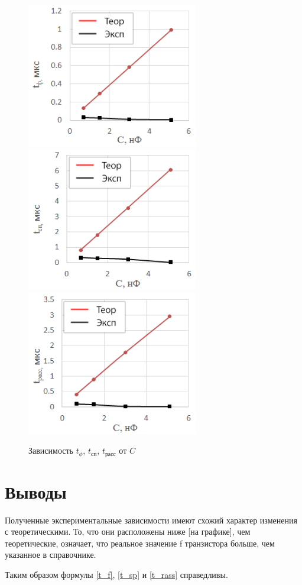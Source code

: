 \begin{figure}[H]
	\begin{center}
		\includegraphics[width=7.5cm]{img/tf_c}
		\includegraphics[width=7.5cm]{img/tsp_c}
		\includegraphics[width=7.5cm]{img/trass_c}
		\caption{Зависимость $t_\phi$, $t_\text{сп}$, $t_\text{расс}$ от $C$}
		\label{fig:c}
	\end{center}
\end{figure}

\section{Выводы}

Полученные экспериментальные зависимости имеют схожий характер изменения с теоретическими. То, что они расположены ниже [на графике], чем теоретические, означает, что реальное значение f транзистора больше, чем указанное в справочнике. 

Таким образом формулы \ref{t_f}, \ref{t_sp} и \ref{t_rass} справедливы.


